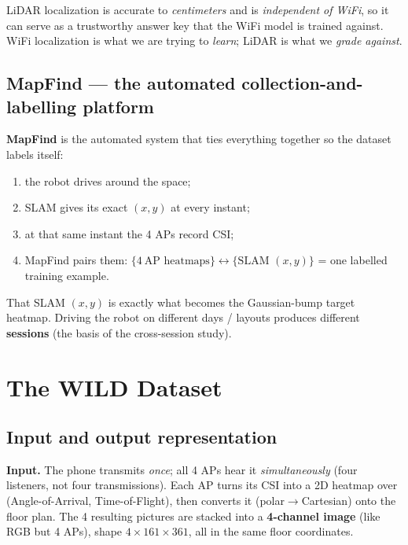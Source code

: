 \documentclass[11pt]{article}
\begin{document}
\begin{keybox}
LiDAR localization is accurate to \emph{centimeters} and is \emph{independent of WiFi}, so it can
serve as a trustworthy answer key that the WiFi model is trained against. WiFi localization is
what we are trying to \emph{learn}; LiDAR is what we \emph{grade against}.
\end{keybox}

\subsection*{MapFind --- the automated collection-and-labelling platform}
\textbf{MapFind} is the automated system that ties everything together so the dataset labels itself:
\begin{enumerate}[noitemsep]
  \item the robot drives around the space;
  \item SLAM gives its exact $(x,y)$ at every instant;
  \item at that same instant the 4 APs record CSI;
  \item MapFind pairs them: $\{4~\text{AP heatmaps}\} \leftrightarrow \{\text{SLAM }(x,y)\}$ = one
        labelled training example.
\end{enumerate}
That SLAM $(x,y)$ is exactly what becomes the Gaussian-bump target heatmap. Driving the robot on
different days / layouts produces different \textbf{sessions} (the basis of the cross-session study).

\section{The WILD Dataset}

\subsection*{Input and output representation}
\textbf{Input.} The phone transmits \emph{once}; all 4 APs hear it \emph{simultaneously} (four
listeners, not four transmissions). Each AP turns its CSI into a 2D heatmap over (Angle-of-Arrival,
Time-of-Flight), then converts it (polar$\to$Cartesian) onto the floor plan. The 4 resulting
pictures are stacked into a \textbf{4-channel image} (like RGB but 4 APs), shape
$4 \times 161 \times 361$, all in the same floor coordinates.
\end{document}
